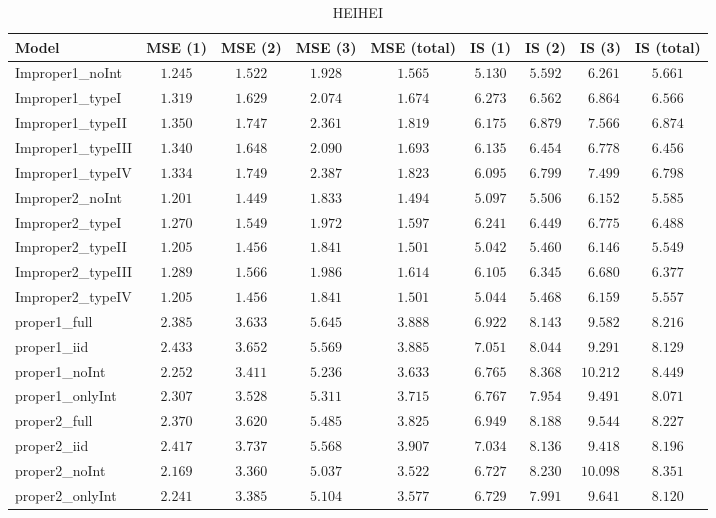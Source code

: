 \begin{table}

\caption{\label{tab:model-choice-sc11}HEIHEI}
\centering
\begin{tabular}{lcccccccc}
\hline
Model  & MSE (1) & MSE (2) & MSE (3) & MSE (total) & IS (1) & IS (2) & IS (3) & \multicolumn{1}{c}{IS (total)} \\ 
\hline
Improper1_noInt  & $1.245$ & $1.522$ & $1.928$ & $1.565$ & $5.130$ & $5.592$ & $\phantom{0}6.261$ & $5.661$ \\
Improper1_typeI  & $1.319$ & $1.629$ & $2.074$ & $1.674$ & $6.273$ & $6.562$ & $\phantom{0}6.864$ & $6.566$ \\
Improper1_typeII  & $1.350$ & $1.747$ & $2.361$ & $1.819$ & $6.175$ & $6.879$ & $\phantom{0}7.566$ & $6.874$ \\
Improper1_typeIII  & $1.340$ & $1.648$ & $2.090$ & $1.693$ & $6.135$ & $6.454$ & $\phantom{0}6.778$ & $6.456$ \\
Improper1_typeIV  & $1.334$ & $1.749$ & $2.387$ & $1.823$ & $6.095$ & $6.799$ & $\phantom{0}7.499$ & $6.798$ \\
Improper2_noInt  & $1.201$ & $1.449$ & $1.833$ & $1.494$ & $5.097$ & $5.506$ & $\phantom{0}6.152$ & $5.585$ \\
Improper2_typeI  & $1.270$ & $1.549$ & $1.972$ & $1.597$ & $6.241$ & $6.449$ & $\phantom{0}6.775$ & $6.488$ \\
Improper2_typeII  & $1.205$ & $1.456$ & $1.841$ & $1.501$ & $5.042$ & $5.460$ & $\phantom{0}6.146$ & $5.549$ \\
Improper2_typeIII  & $1.289$ & $1.566$ & $1.986$ & $1.614$ & $6.105$ & $6.345$ & $\phantom{0}6.680$ & $6.377$ \\
Improper2_typeIV  & $1.205$ & $1.456$ & $1.841$ & $1.501$ & $5.044$ & $5.468$ & $\phantom{0}6.159$ & $5.557$ \\
proper1_full  & $2.385$ & $3.633$ & $5.645$ & $3.888$ & $6.922$ & $8.143$ & $\phantom{0}9.582$ & $8.216$ \\
proper1_iid  & $2.433$ & $3.652$ & $5.569$ & $3.885$ & $7.051$ & $8.044$ & $\phantom{0}9.291$ & $8.129$ \\
proper1_noInt  & $2.252$ & $3.411$ & $5.236$ & $3.633$ & $6.765$ & $8.368$ & $10.212$ & $8.449$ \\
proper1_onlyInt  & $2.307$ & $3.528$ & $5.311$ & $3.715$ & $6.767$ & $7.954$ & $\phantom{0}9.491$ & $8.071$ \\
proper2_full  & $2.370$ & $3.620$ & $5.485$ & $3.825$ & $6.949$ & $8.188$ & $\phantom{0}9.544$ & $8.227$ \\
proper2_iid  & $2.417$ & $3.737$ & $5.568$ & $3.907$ & $7.034$ & $8.136$ & $\phantom{0}9.418$ & $8.196$ \\
proper2_noInt  & $2.169$ & $3.360$ & $5.037$ & $3.522$ & $6.727$ & $8.230$ & $10.098$ & $8.351$ \\
proper2_onlyInt  & $2.241$ & $3.385$ & $5.104$ & $3.577$ & $6.729$ & $7.991$ & $\phantom{0}9.641$ & $8.120$ \\
\hline 
\end{tabular}


\end{table}